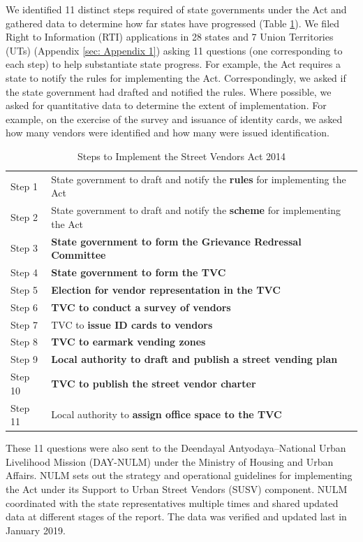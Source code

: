 \documentclass[a4paper, 12pt, twoside]{article}
\begin{document}
{	We identified 11 distinct steps required of state governments under the Act and gathered data to determine how far states have progressed (Table \ref{tab: SVACsteps}). We filed Right to Information (RTI) applications in 28 states and 7 Union Territories (UTs) (Appendix \ref{sec: Appendix 1}) asking 11 questions (one corresponding to each step) to help substantiate state progress. For example, the Act requires a state to notify the rules for implementing the Act. Correspondingly, we asked if the state government had drafted and notified the rules. Where possible, we asked for quantitative data to determine the extent of implementation. For example, on the exercise of the survey and issuance of identity cards, we asked how many vendors were identified and how many were issued identification.

\begin{table}[htpb]
\caption{Steps to Implement the Street Vendors Act 2014}
\label{tab: SVACsteps}
\begin{tabular}{ l  l } %
\toprule
Step 1	&	State government to draft and notify the \textbf{rules} for implementing the Act\\
Step 2 	&	State government to draft and notify the \textbf{scheme} for implementing the Act\\
Step 3	&	\textbf{State government to form the Grievance Redressal Committee}\\
Step 4	&	\textbf{State government to form the TVC}\\
Step 5	&	\textbf{Election for vendor representation in the TVC}\\
Step 6	&	\textbf{TVC to conduct a survey of vendors}\\
Step 7	&	TVC to \textbf{issue ID cards to vendors}\\
Step 8	&	\textbf{TVC to earmark vending zones}\\
Step 9 	&	\textbf{Local authority to draft and publish a street vending plan}\\
Step 10	&	\textbf{TVC to publish the street vendor charter}\\
Step 11	&	Local authority to \textbf{assign office space to the TVC}\\
\bottomrule
\end{tabular}
\end{table}

These 11 questions were also sent to the Deendayal Antyodaya–National Urban Livelihood Mission (DAY-NULM) under the Ministry of Housing and Urban Affairs. NULM sets out the strategy and operational guidelines for implementing the Act under its Support to Urban Street Vendors (SUSV) component. NULM coordinated with the state representatives multiple times and shared updated data at different stages of the report. The data was verified and updated last in January 2019.

}
\end{document}
